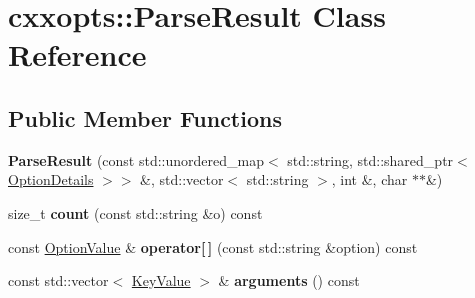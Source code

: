 \hypertarget{classcxxopts_1_1ParseResult}{}\section{cxxopts\+:\+:Parse\+Result Class Reference}
\label{classcxxopts_1_1ParseResult}
\subsection*{Public Member Functions}
\begin{DoxyCompactItemize}
\item 
{\bfseries Parse\+Result} (const std\+::unordered\+\_\+map$<$ std\+::string, std\+::shared\+\_\+ptr$<$ \hyperlink{classcxxopts_1_1OptionDetails}{Option\+Details} $>$$>$ \&, std\+::vector$<$ std\+::string $>$, int \&, char $\ast$$\ast$\&)\hypertarget{classcxxopts_1_1ParseResult_a547f81d147a8c462f9c5adbac3ac0f66}{}\label{classcxxopts_1_1ParseResult_a547f81d147a8c462f9c5adbac3ac0f66}

\item 
size\+\_\+t {\bfseries count} (const std\+::string \&o) const \hypertarget{classcxxopts_1_1ParseResult_ab7f33cbd795b595e672c5a4033c06df4}{}\label{classcxxopts_1_1ParseResult_ab7f33cbd795b595e672c5a4033c06df4}

\item 
const \hyperlink{classcxxopts_1_1OptionValue}{Option\+Value} \& {\bfseries operator\mbox{[}$\,$\mbox{]}} (const std\+::string \&option) const \hypertarget{classcxxopts_1_1ParseResult_ad8a5a4283f54f91fbeba8c210f75813b}{}\label{classcxxopts_1_1ParseResult_ad8a5a4283f54f91fbeba8c210f75813b}

\item 
const std\+::vector$<$ \hyperlink{classcxxopts_1_1KeyValue}{Key\+Value} $>$ \& {\bfseries arguments} () const \hypertarget{classcxxopts_1_1ParseResult_abb2de686b888afd520e8e522f50f37f5}{}\label{classcxxopts_1_1ParseResult_abb2de686b888afd520e8e522f50f37f5}

\end{DoxyCompactItemize}
